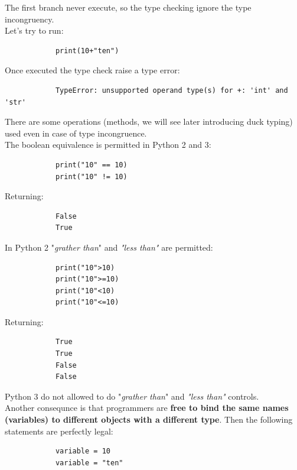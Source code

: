 \documentclass[12pt]{article}
\begin{document}
		The first branch never execute, so the type checking ignore the type incongruency.\\
		Let's try to run:
		
		\begin{lstlisting}
			print(10+"ten")
		\end{lstlisting}
		
		Once executed the type check raise a type error:
		
		\begin{lstlisting}
			TypeError: unsupported operand type(s) for +: 'int' and 'str'
		\end{lstlisting}
		
		There are some operations (methods, we will see later introducing duck typing) used even in case of type incongruence. \\
		The boolean equivalence is permitted in Python 2 and 3: 
		
		\begin{lstlisting}
			print("10" == 10)
			print("10" != 10)
		\end{lstlisting}
		
		Returning:
		
		\begin{lstlisting}
			False
			True
		\end{lstlisting}
		
		In Python 2 "\textit{grather than}" and \textit{"less than"} are permitted:
		
		\begin{lstlisting}
			print("10">10)
			print("10">=10)
			print("10"<10)
			print("10"<=10)
		\end{lstlisting}
		
		Returning:
		
		\begin{lstlisting}
			True
			True
			False
			False
		\end{lstlisting}
		
		Python 3 do not allowed to do "\textit{grather than}" and \textit{"less than"} controls.\\
		
		Another consequnce is that programmers are \textbf{free to bind the same names (variables) to different objects with a different type}. Then the following statements are perfectly legal:
		
		\begin{lstlisting}
			variable = 10
			variable = "ten"
		\end{lstlisting}
		
\end{document}
